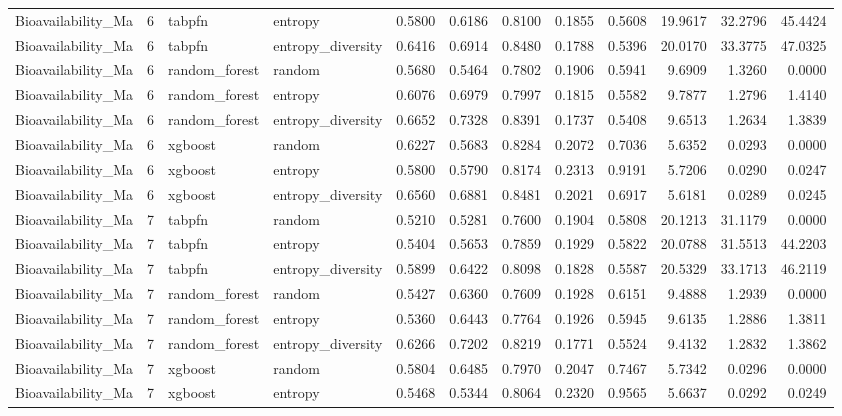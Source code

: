 \begin{tabular}{lrllrrrrrrrr}
Bioavailability_Ma & 6 & tabpfn & entropy & 0.5800 & 0.6186 & 0.8100 & 0.1855 & 0.5608 & 19.9617 & 32.2796 & 45.4424 \\
Bioavailability_Ma & 6 & tabpfn & entropy_diversity & 0.6416 & 0.6914 & 0.8480 & 0.1788 & 0.5396 & 20.0170 & 33.3775 & 47.0325 \\
Bioavailability_Ma & 6 & random_forest & random & 0.5680 & 0.5464 & 0.7802 & 0.1906 & 0.5941 & 9.6909 & 1.3260 & 0.0000 \\
Bioavailability_Ma & 6 & random_forest & entropy & 0.6076 & 0.6979 & 0.7997 & 0.1815 & 0.5582 & 9.7877 & 1.2796 & 1.4140 \\
Bioavailability_Ma & 6 & random_forest & entropy_diversity & 0.6652 & 0.7328 & 0.8391 & 0.1737 & 0.5408 & 9.6513 & 1.2634 & 1.3839 \\
Bioavailability_Ma & 6 & xgboost & random & 0.6227 & 0.5683 & 0.8284 & 0.2072 & 0.7036 & 5.6352 & 0.0293 & 0.0000 \\
Bioavailability_Ma & 6 & xgboost & entropy & 0.5800 & 0.5790 & 0.8174 & 0.2313 & 0.9191 & 5.7206 & 0.0290 & 0.0247 \\
Bioavailability_Ma & 6 & xgboost & entropy_diversity & 0.6560 & 0.6881 & 0.8481 & 0.2021 & 0.6917 & 5.6181 & 0.0289 & 0.0245 \\
Bioavailability_Ma & 7 & tabpfn & random & 0.5210 & 0.5281 & 0.7600 & 0.1904 & 0.5808 & 20.1213 & 31.1179 & 0.0000 \\
Bioavailability_Ma & 7 & tabpfn & entropy & 0.5404 & 0.5653 & 0.7859 & 0.1929 & 0.5822 & 20.0788 & 31.5513 & 44.2203 \\
Bioavailability_Ma & 7 & tabpfn & entropy_diversity & 0.5899 & 0.6422 & 0.8098 & 0.1828 & 0.5587 & 20.5329 & 33.1713 & 46.2119 \\
Bioavailability_Ma & 7 & random_forest & random & 0.5427 & 0.6360 & 0.7609 & 0.1928 & 0.6151 & 9.4888 & 1.2939 & 0.0000 \\
Bioavailability_Ma & 7 & random_forest & entropy & 0.5360 & 0.6443 & 0.7764 & 0.1926 & 0.5945 & 9.6135 & 1.2886 & 1.3811 \\
Bioavailability_Ma & 7 & random_forest & entropy_diversity & 0.6266 & 0.7202 & 0.8219 & 0.1771 & 0.5524 & 9.4132 & 1.2832 & 1.3862 \\
Bioavailability_Ma & 7 & xgboost & random & 0.5804 & 0.6485 & 0.7970 & 0.2047 & 0.7467 & 5.7342 & 0.0296 & 0.0000 \\
Bioavailability_Ma & 7 & xgboost & entropy & 0.5468 & 0.5344 & 0.8064 & 0.2320 & 0.9565 & 5.6637 & 0.0292 & 0.0249 \\

\end{tabular}
